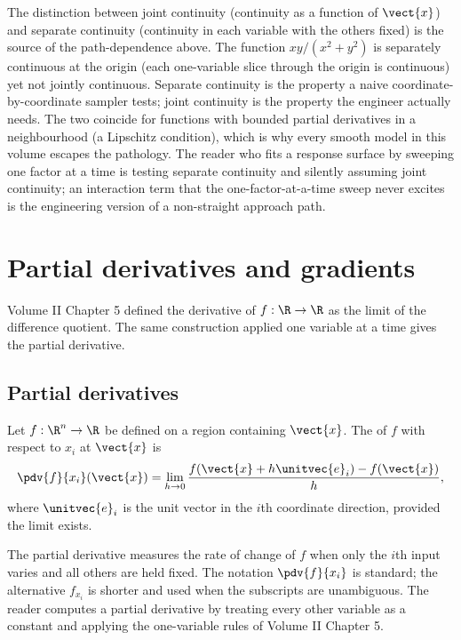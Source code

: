 \begin{mastery}
The distinction between joint continuity (continuity as a function
of $\vect{x}$) and separate continuity (continuity in each variable
with the others fixed) is the source of the path-dependence above.
The function $xy/(x^{2} + y^{2})$ is separately continuous at the
origin (each one-variable slice through the origin is continuous)
yet not jointly continuous. Separate continuity is the property a
naive coordinate-by-coordinate sampler tests; joint continuity is
the property the engineer actually needs. The two coincide for
functions with bounded partial derivatives in a neighbourhood (a
Lipschitz condition), which is why every smooth model in this volume
escapes the pathology. The reader who fits a response surface by
sweeping one factor at a time is testing separate continuity and
silently assuming joint continuity; an interaction term that the
one-factor-at-a-time sweep never excites is the engineering version
of a non-straight approach path.
\end{mastery}

\section{Partial derivatives and gradients}

Volume II Chapter 5 defined the derivative of $f : \R \to \R$ as
the limit of the difference quotient. The same construction applied
one variable at a time gives the partial derivative.

\subsection{Partial derivatives}

\begin{definition}
Let $f : \R^{n} \to \R$ be defined on a region containing
$\vect{x}$. The  of $f$ with respect to
$x_{i}$ at $\vect{x}$ is
\[
\pdv{f}{x_{i}}(\vect{x}) = \lim_{h \to 0}
\frac{f(\vect{x} + h \unitvec{e}_{i}) - f(\vect{x})}{h},
\]
where $\unitvec{e}_{i}$ is the unit vector in the $i$th coordinate
direction, provided the limit exists.
\end{definition}

The partial derivative measures the rate of change of $f$ when only
the $i$th input varies and all others are held fixed. The notation
$\pdv{f}{x_{i}}$ is standard; the alternative $f_{x_{i}}$ is shorter
and used when the subscripts are unambiguous. The reader computes a
partial derivative by treating every other variable as a constant
and applying the one-variable rules of Volume II Chapter 5.

